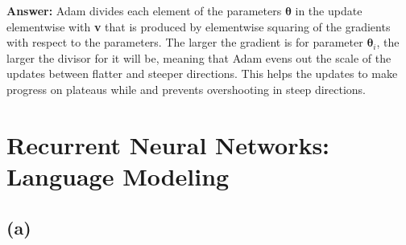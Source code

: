 \documentclass[11pt]{article}
\begin{document}
\textbf{Answer:}
Adam divides each element of the parameters $\bm{\theta}$ in the update elementwise with \textbf{v} that is produced by elementwise squaring of the gradients with respect to the parameters. The larger the gradient is for parameter $\bm{\theta}_i$, the larger the divisor for it will be, meaning that Adam evens out the scale of the updates between flatter and steeper directions. This helps the updates to make progress on plateaus while and prevents overshooting in steep directions.

\section{Recurrent Neural Networks: Language Modeling}
\subsection*{(a)}
\end{document}
